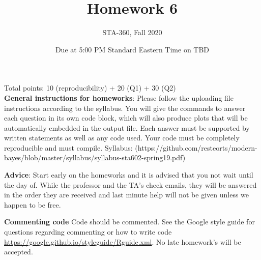 \documentclass{article}
\begin{document}
\title{Homework 6}
\author{STA-360, Fall 2020}
\date{Due at 5:00 PM Standard Eastern Time on TBD}
\maketitle

Total points: 10 (reproducibility) + 20 (Q1) + 30 (Q2)\\

\textbf{General instructions for homeworks}: Please follow the uploading file instructions according to the syllabus. You will give the commands to answer each question in its own code block, which will also produce plots that will be automatically embedded in the output file. Each answer must be supported by written statements as well as any code used. Your code must be completely reproducible and must compile. Syllabus: (https://github.com/resteorts/modern-bayes/blob/master/syllabus/syllabus-sta602-spring19.pdf)

\textbf{Advice}: Start early on the homeworks and it is advised that you not wait until the day of. While the professor and the TA's check emails, they will be answered in the order they are received and last minute help will not be given unless we happen to be free.  

\textbf{Commenting code}
Code should be commented. See the Google style guide for questions regarding commenting or how to write 
code \url{https://google.github.io/styleguide/Rguide.xml}. No late homework's will be accepted.
\end{document}
